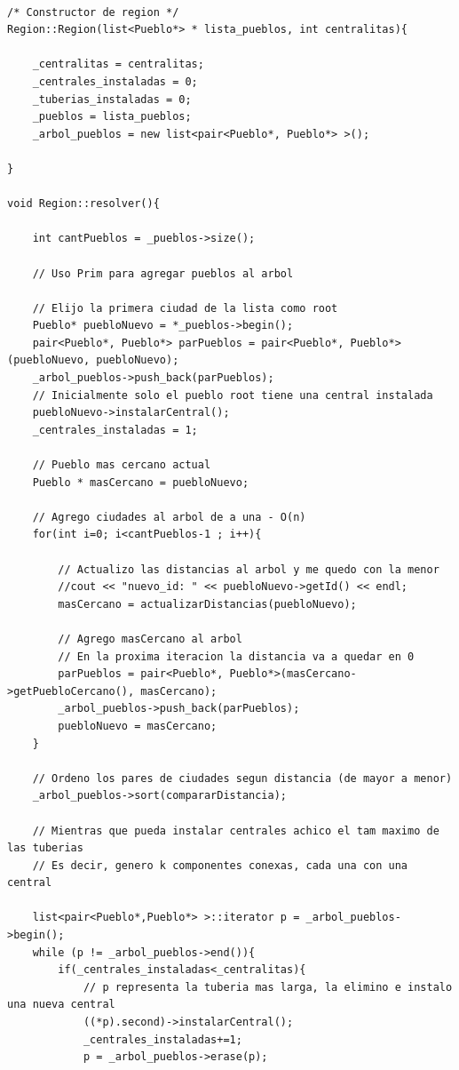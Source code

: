 \begin{lstlisting}

/* Constructor de region */
Region::Region(list<Pueblo*> * lista_pueblos, int centralitas){
	
	_centralitas = centralitas;
	_centrales_instaladas = 0;
	_tuberias_instaladas = 0;
	_pueblos = lista_pueblos;
	_arbol_pueblos = new list<pair<Pueblo*, Pueblo*> >();

}

void Region::resolver(){

	int cantPueblos = _pueblos->size();
	
	// Uso Prim para agregar pueblos al arbol

	// Elijo la primera ciudad de la lista como root
	Pueblo* puebloNuevo = *_pueblos->begin();
	pair<Pueblo*, Pueblo*> parPueblos = pair<Pueblo*, Pueblo*>(puebloNuevo, puebloNuevo);
	_arbol_pueblos->push_back(parPueblos);
	// Inicialmente solo el pueblo root tiene una central instalada
	puebloNuevo->instalarCentral();
	_centrales_instaladas = 1;

	// Pueblo mas cercano actual
	Pueblo * masCercano = puebloNuevo;

	// Agrego ciudades al arbol de a una - O(n)
	for(int i=0; i<cantPueblos-1 ; i++){
		
		// Actualizo las distancias al arbol y me quedo con la menor
		//cout << "nuevo_id: " << puebloNuevo->getId() << endl;
		masCercano = actualizarDistancias(puebloNuevo);

		// Agrego masCercano al arbol
		// En la proxima iteracion la distancia va a quedar en 0
		parPueblos = pair<Pueblo*, Pueblo*>(masCercano->getPuebloCercano(), masCercano);
		_arbol_pueblos->push_back(parPueblos);
		puebloNuevo = masCercano;
	}

	// Ordeno los pares de ciudades segun distancia (de mayor a menor)
	_arbol_pueblos->sort(compararDistancia);

	// Mientras que pueda instalar centrales achico el tam maximo de las tuberias
	// Es decir, genero k componentes conexas, cada una con una central

	list<pair<Pueblo*,Pueblo*> >::iterator p = _arbol_pueblos->begin();
	while (p != _arbol_pueblos->end()){
		if(_centrales_instaladas<_centralitas){
			// p representa la tuberia mas larga, la elimino e instalo una nueva central
			((*p).second)->instalarCentral();
			_centrales_instaladas+=1;
			p = _arbol_pueblos->erase(p);
			

\end{lstlisting}
